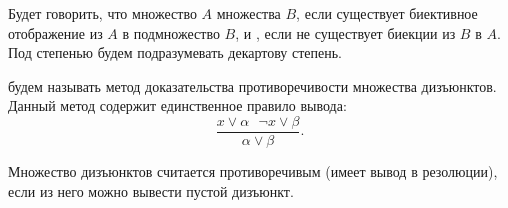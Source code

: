 





\begin{definition*}
    Будет говорить, что множество $A$  множества $B$, если существует биективное
    отображение из $A$ в подмножество $B$, и , если не существует биекции из $B$ в
    $A$. Под степенью будем подразумевать декартову степень.
\end{definition*}


\begin{definition*}
     будем называть метод доказательства противоречивости множества
    дизъюнктов. Данный метод содержит единственное правило вывода:
    $$
        \frac{x \vee \alpha \ \ \ \neg x \vee \beta}{\alpha \vee \beta}.
    $$

    Множество дизъюнктов считается противоречивым (имеет вывод в резолюции), если из него можно вывести
    пустой дизъюнкт.
\end{definition*}







